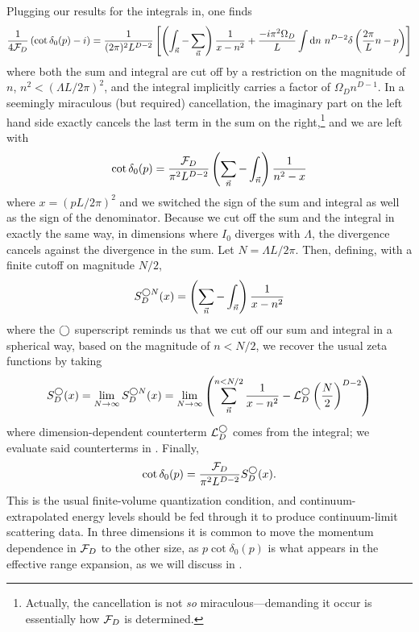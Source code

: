 Plugging our results for the integrals in, one finds
\begin{equation}
    \frac{1}{4\mathcal{F}_D}\left(\cot \delta_0(p) - i\right) = \frac{1}{(2\pi)^2 L^{D-2}}\left[ \left(\int_{\vec{n}} - \sum_{\vec{n}}\right) \frac{1}{x-n^2} + \frac{-i \pi^2\Omega_D}{L} \int \mathrm{d}n\ n^{D-2} \delta\left(\frac{2\pi}{L}n - p\right) \right]
\end{equation}
where both the sum and integral are cut off by a restriction on the magnitude of $n$, $n^2 < (\Lambda L / 2\pi)^2$, and the integral implicitly carries a factor of $\Omega_D n^{D-1}$.
In a seemingly miraculous (but required) cancellation, the imaginary part on the left hand side exactly cancels the last term in the sum on the right,\footnote{Actually, the cancellation is not \emph{so} miraculous---demanding it occur is essentially how $\mathcal{F}_D$ is determined.} and we are left with
\begin{equation}
    \cot \delta_0(p) = \frac{\mathcal{F}_D}{\pi^2 L^{D-2}} \left(\sum_{\vec{n}}-\int_{\vec{n}}\right) \frac{1}{n^2-x}
\end{equation}
where $x=(pL/2\pi)^2$ and we switched the sign of the sum and integral as well as the sign of the denominator.
Because we cut off the sum and the integral in exactly the same way, in dimensions where $I_0$ diverges with $\Lambda$, the divergence cancels against the divergence in the sum.
Let $N=\Lambda L/2\pi$.
Then, defining, with a finite cutoff on magnitude $N/2$,
\begin{equation}\label{eq:spherical cutoff S}
    S^{\bigcirc N}_D(x) = \left(\sum_{\vec{n}}- \int_{\vec{n}}\right) \frac{1}{x-n^2}
\end{equation}
where the $\bigcirc$ superscript reminds us that we cut off our sum and integral in a spherical way, based on the magnitude of $n<N/2$, we recover the usual \Luscher zeta functions by taking
\begin{equation}\label{eq:spherical S}
    S^\bigcirc_D(x)
    =
    \lim_{N\rightarrow\infty} S^{\bigcirc N}_D(x)
    =
    \lim_{N\rightarrow\infty}\left( \sum_{\vec{n}}^{n < N/2} \frac{1}{x-n^2} - \mathcal{L}_D^\bigcirc \left(\frac{N}{2}\right)^{D-2}\right)
\end{equation}
where dimension-dependent counterterm $\mathcal{L}_D^\bigcirc$ comes from the integral; we evaluate said counterterms in .
Finally,
\begin{equation}\label{eq:spherical quantization}
    \cot \delta_0(p) = \frac{\mathcal{F}_D}{\pi^2 L^{D-2}} S^\bigcirc_D(x).
\end{equation}
This is the usual \Luscher finite-volume quantization condition, and continuum-extrapolated energy levels should be fed through it to produce continuum-limit scattering data.
In three dimensions it is common to move the momentum dependence in $\mathcal{F}_D$ to the other size, as $p \cot\delta_0(p)$ is what appears in the effective range expansion, as we will discuss in .

